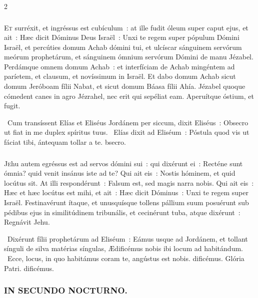 \documentclass[9pt,twoside]{extarticle}
\begin{document}
\begin{multicols}{2}
{\subsubsection*{\center {}}
\lettrine{E}t surréxit, et ingréssus est cubículum~: at ille fudit óleum super caput ejus, et ait~: Hæc dicit Dóminus Deus Israël~: Unxi te regem super pópulum Dómini Israël,
et percúties domum Achab dómini tui, et ulcíscar sánguinem servórum meórum prophetárum, et sánguinem ómnium servórum Dómini de manu Jézabel.
Perdámque omnem domum Achab~: et interfíciam de Achab mingéntem ad paríetem, et clausum, et novíssimum in Israël.
Et dabo domum Achab sicut domum Jeróboam fílii Nabat, et sicut domum Báasa fílii Ahía.
Jézabel quoque cómedent canes in agro Jézrahel, nec erit qui sepéliat eam. Aperuítque óstium, et fugit.

\begin{tightlist}{}
\item {}~Cum transíssent Elías et Eliséus Jordánem per siccum, dixit Eliséus~: \textred{*} Obsecro ut fiat in me duplex spíritus tuus. ~Elías dixit ad Eliséum~: Póstula quod vis ut fáciat tibi, ántequam tollar a te. bsecro.
\end{tightlist}

\subsubsection*{\center {}}
\lettrine{J}ehu autem egréssus est ad servos dómini sui~: qui dixérunt ei~: Recténe sunt ómnia? quid venit insánus iste ad te? Qui ait eis~: Nostis hóminem, et quid locútus sit.
At illi respondérunt~: Falsum est, sed magis narra nobis. Qui ait eis~: Hæc et hæc locútus est mihi, et ait~: Hæc dicit Dóminus~: Unxi te regem super Israël.
Festinavérunt ítaque, et unusquísque tollens pállium suum posuérunt sub pédibus ejus in similitúdinem tribunális, et cecinérunt tuba, atque dixérunt~: Regnávit Jehu.

\begin{tightlist}{}
\item {}~Dixérunt fílii prophetárum ad Eliséum~: Eámus usque ad Jordánem, et tollant sínguli de silva matérias síngulas, \textred{*} Ædificémus nobis ibi locum ad habitándum. ~Ecce, locus, in quo habitámus coram te, angústus est nobis. dificémus. Glória Patri. dificémus.
\end{tightlist}

\subsubsection*{\center \textsc{IN SECUNDO NOCTURNO.}}
}
\end{multicols}
\end{document}
